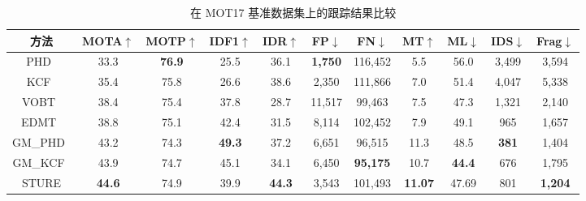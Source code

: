 \vspace{0.5em}
\renewcommand\arraystretch{1.5}
\begin{table}[htbp]\wuhao
	\centering
	\caption{在 MOT17 基准数据集上的跟踪结果比较}
	\vspace{0.3em}
	\begin{tabular}{c|cccccccccc}
		\hline
		方法   & MOTA$ \uparrow $ & MOTP$ \uparrow $  & IDF1$ \uparrow $  & IDR$ \uparrow $ & FP$ \downarrow $  & FN$ \downarrow $  & MT$ \uparrow $  & ML$ \downarrow $  & IDS$ \downarrow $  & Frag$ \downarrow $\\ 
		\hline
		PHD~\cite{ban2016tracking}    &33.3 &\bfseries76.9 &25.5 &36.1 &\bfseries1,750 &116,452 &5.5 &56.0 &3,499 &3,594\\
		KCF~\cite{chen2017enhancing}   &35.4 &75.8 &26.6 &38.6 &2,350 &111,866 &7.0 &51.4 &4,047 &5,338\\
		VOBT~\cite{ban2016tracking}   &38.4 &75.4 &37.8 &28.7 &11,517 &99,463 &7.5 &47.3 &1,321 &2,140\\
		EDMT~\cite{chen2017enhancing}  &38.8 &75.1 &42.4 &31.5 &8,114 &102,452 &7.9 &49.1 &965 &1,657\\
		GM\_PHD~\cite{ban2016tracking}   &43.2 &74.3 &\bfseries49.3 &37.2 &6,651 &96,515 &11.3 &48.5 &\bfseries381 &1,404\\
		GM\_KCF~\cite{chen2017enhancing}     &43.9 &74.7 &45.1 &34.1 &6,450 &\bfseries95,175 &10.7 &\bfseries44.4 &676 &1,795\\
		STURE     &\bfseries44.6 &74.9 &39.9 &\bfseries44.3 &3,543 &101,493 &\bfseries11.07 &47.69  &801 &\bfseries1,204\\
		\hline
	\end{tabular}
	\label{tab:sture_performance_MOT17}
\end{table}


